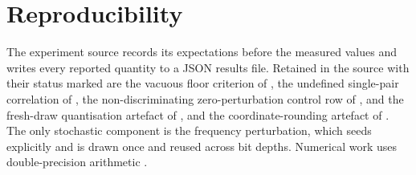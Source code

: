 \documentclass[11pt,twocolumn,a4paper]{article}
\theoremstyle{upthm}
\theoremstyle{definition}
\theoremstyle{remark}
\begin{document}
\section*{Reproducibility}

The experiment source records its expectations before the measured values
and writes every reported quantity to a JSON results file. Retained in
the source with their status marked are the vacuous floor criterion of
, the undefined single-pair correlation of
, the non-discriminating zero-perturbation control row of
, and the fresh-draw quantisation artefact of
, and the coordinate-rounding artefact of
. The only stochastic component is the frequency
perturbation, which seeds explicitly and is drawn once and reused across
bit depths. Numerical work uses double-precision arithmetic
\citep{ieee754,harris2020}.



\end{document}
